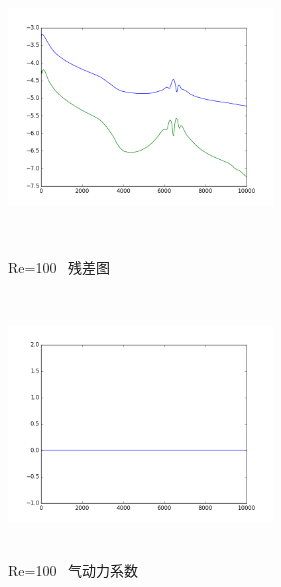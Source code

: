 \documentclass[UTF8]{ctexart}
\begin{document}
\begin{figure}[htbp]
\begin{minipage}{7cm}
\includegraphics[height=7cm,width=7cm]{../pic/Residue_100.png}
\caption{Re=100 \ 残差图}
\end{minipage}
\begin{minipage}{7cm}
\includegraphics[height=7cm,width=7cm]{../pic/Aerodynamics_100.png}
\caption{Re=100 \ 气动力系数}
\end{minipage}
\end{figure}
\clearpage
\end{document}
